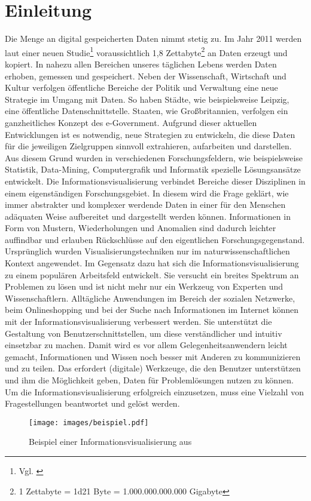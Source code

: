\documentclass[a4paper, 
               12pt,
               DIV=calc,
               version=first,
               pdftex,
               headsepline,
               footsepline,
               bibliography=totocnumbered,
               listof=numbered]{scrreprt}
\begin{document}
\chapter{Einleitung}
\label{cha:Einleitung}
Die Menge an digital gespeicherten Daten nimmt stetig zu. Im Jahr 2011 werden laut einer neuen
Studie\footnote{Vgl. \citep{EMC}} voraussichtlich 1,8 Zettabyte\footnote{1 Zettabyte = \num{1d21}
Byte = 1.000.000.000.000 Gigabyte} an Daten erzeugt und kopiert. In nahezu allen Bereichen unseres
täglichen Lebens werden Daten erhoben, gemessen und gespeichert. Neben der Wissenschaft, Wirtschaft
und Kultur verfolgen öffentliche Bereiche der Politik und Verwaltung eine neue Strategie im Umgang
mit Daten. So haben Städte, wie beispielsweise Leipzig, eine öffentliche Datenschnittstelle.
Staaten, wie Großbritannien, verfolgen ein ganzheitliches Konzept des e-Government. Aufgrund dieser
aktuellen Entwicklungen ist es notwendig, neue Strategien zu entwickeln, die diese Daten
für die jeweiligen Zielgruppen sinnvoll extrahieren, aufarbeiten und darstellen. Aus diesem
Grund wurden in verschiedenen Forschungsfeldern, wie beispielsweise Statistik, Data-Mining,
Computergrafik und Informatik spezielle Lösungsansätze entwickelt.
Die Informationsvisualisierung verbindet Bereiche dieser Disziplinen in einem eigenständigen
Forschungsgebiet.
In diesem wird die Frage geklärt, wie immer abstrakter und komplexer werdende Daten
in einer für den Menschen adäquaten Weise aufbereitet und dargestellt werden können. 
Informationen in Form von Mustern, Wiederholungen und Anomalien sind dadurch leichter auffindbar und erlauben
Rückschlüsse auf den eigentlichen Forschungsgegenstand. Ursprünglich wurden Visualisierungstechniken nur im
naturwissenschaftlichen Kontext angewendet.
Im Gegensatz dazu hat sich die Informationsvisualisierung zu einem populären Arbeitsfeld entwickelt. Sie versucht ein breites
Spektrum an Problemen zu lösen und ist nicht mehr nur ein Werkzeug von Experten und Wissenschaftlern.
Alltägliche Anwendungen
im Bereich der sozialen Netzwerke, beim Onlineshopping und bei der Suche nach Informationen
im Internet können mit der Informationsvisualisierung verbessert
werden. Sie unterstützt die Gestaltung von Benutzerschnittstellen, um diese verständlicher und intuitiv einsetzbar zu machen.
Damit wird es vor allem Gelegenheitsanwendern leicht gemacht, Informationen und
Wissen noch besser mit Anderen zu kommunizieren und zu teilen. Das erfordert (digitale) Werkzeuge,
die den Benutzer unterstützen und ihm die Möglichkeit geben, Daten für Problemlösungen nutzen zu können.
Um die Informationsvisualisierung erfolgreich einzusetzen, muss eine Vielzahl von Fragestellungen
beantwortet und gelöst werden.
\begin{figure}
\centering
\texttt{[image: images/beispiel.pdf]}
\caption{Beispiel einer Informationsvisualisierung aus \citep[S.\,76]{McCandless}}
\label{fig:beispiel}
\end{figure}
\end{document}
